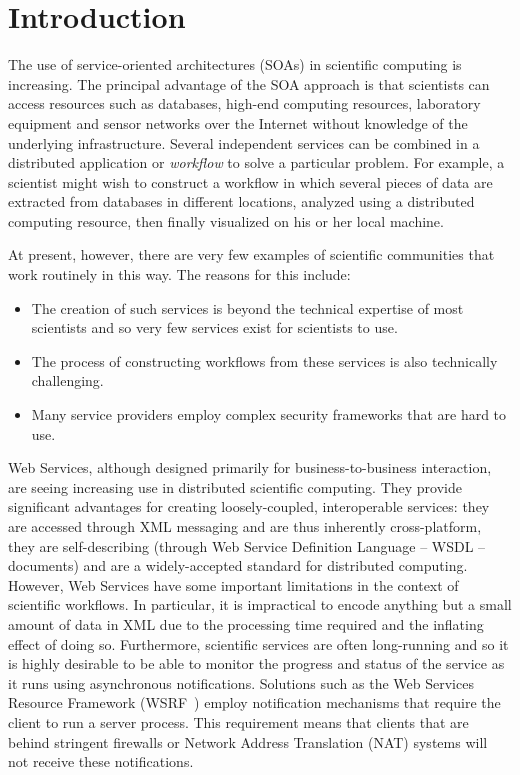\documentclass[a4paper]{article}
\begin{document}
\section{Introduction}\label{sec:intro}
The use of service-oriented architectures (SOAs) in scientific computing is increasing.  The principal advantage of the SOA approach is that scientists can access resources such as databases, high-end computing resources, laboratory equipment and sensor networks over the Internet without knowledge of the underlying infrastructure.  Several independent services can be combined in a distributed application or \textit{workflow\/} to solve a particular problem.  For example, a scientist might wish to construct a workflow in which several pieces of data are extracted from databases in different locations, analyzed using a distributed computing resource, then finally visualized on his or her local machine.

At present, however, there are very few examples of scientific communities that work routinely in this way.  The reasons for this include:

\begin{itemize}
\item The creation of such services is beyond the technical expertise of most scientists and so very few services exist for scientists to use.
\item The process of constructing workflows from these services is also technically challenging.
\item Many service providers employ complex security frameworks that are hard to use.
\end{itemize}

Web Services, although designed primarily for business-to-business interaction, are seeing increasing use in distributed scientific computing.  They provide significant advantages for creating loosely-coupled, interoperable services: they are accessed through XML messaging and are thus inherently cross-platform, they are self-describing (through Web Service Definition Language -- WSDL -- documents) and are a widely-accepted standard for distributed computing.  However, Web Services have some important limitations in the context of scientific workflows. In particular, it is impractical to encode anything but a small amount of data in XML due to the processing time required and the inflating effect of doing so.  Furthermore, scientific services are often long-running and so it is highly desirable to be able to monitor the progress and status of the service as it runs using asynchronous notifications.  Solutions such as the Web Services Resource Framework (WSRF~\cite{WSRF}) employ notification mechanisms that require the client to run a server process.  This requirement means that clients that are behind stringent firewalls or Network Address Translation (NAT) systems will not receive these notifications.
\end{document}
